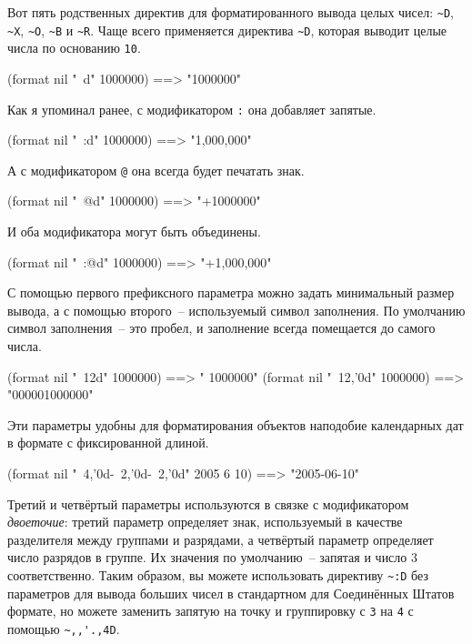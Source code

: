 Вот пять родственных директив для форматированного вывода целых чисел: \lstinline!~D!,
\lstinline!~X!, \lstinline!~O!, \lstinline!~B! и \lstinline!~R!. Чаще всего применяется
директива \lstinline!~D!, которая выводит целые числа по основанию \lstinline{10}.

\begin{myverb}
(format nil "~d" 1000000) ==> "1000000"
\end{myverb}

Как я упоминал ранее, с модификатором \lstinline!:! она добавляет запятые.

\begin{myverb}
(format nil "~:d" 1000000) ==> "1,000,000"
\end{myverb}

А с модификатором \lstinline!@! она всегда будет печатать знак.

\begin{myverb}
(format nil "~@d" 1000000) ==> "+1000000"
\end{myverb}

И оба модификатора могут быть объединены.

\begin{myverb}
(format nil "~:@d" 1000000) ==> "+1,000,000"
\end{myverb}

С помощью первого префиксного параметра можно задать минимальный размер вывода, а с
помощью второго~-- используемый символ заполнения. По умолчанию символ заполнения~-- это
пробел, и заполнение всегда помещается до самого числа.

\begin{myverb}
(format nil "~12d" 1000000)    ==> "     1000000"
(format nil "~12,'0d" 1000000) ==> "000001000000"
\end{myverb}

Эти параметры удобны для форматирования объектов наподобие календарных дат в формате с
фиксированной длиной.

\begin{myverb}
(format nil "~4,'0d-~2,'0d-~2,'0d" 2005 6 10) ==> "2005-06-10"
\end{myverb}

Третий и четвёртый параметры используются в связке с модификатором \textit{двоеточие}:
третий параметр определяет знак, используемый в качестве разделителя между группами и
разрядами, а четвёртый параметр определяет число разрядов в группе. Их значения по
умолчанию~-- запятая и число 3 соответственно. Таким образом, вы можете использовать
директиву \lstinline!~:D! без параметров для вывода больших чисел в стандартном для
Соединённых Штатов формате, но можете заменить запятую на точку и группировку с \lstinline{3}
на \lstinline{4} с помощью \lstinline!~,,'.,4D!.

